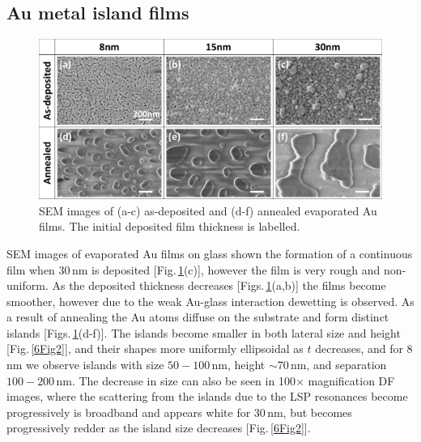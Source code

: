 \subsection{Au metal island films}
\begin{figure}[ht] 
\centering    
\includegraphics[width=\textwidth]{Fig1}
\caption{SEM images of (a-c) as-deposited and (d-f) annealed evaporated Au films. The initial deposited film thickness is labelled.}
\label{6Fig1}
\end{figure}
SEM images of evaporated Au films on glass shown the formation of a continuous film when 30\,nm is deposited [Fig.\,\ref{6Fig1}(c)], however the film is very rough and non-uniform. As the deposited thickness decreases [Figs.\,\ref{6Fig1}(a,b)] the films become smoother, however due to the weak Au-glass interaction dewetting is observed. As a result of annealing the Au atoms diffuse on the substrate and form distinct islands [Figs.\,\ref{6Fig1}(d-f)]. The islands become smaller in both lateral size and height [Fig.\,\ref{6Fig2}], and their shapes more uniformly ellipsoidal as $t$ decreases, and for 8\,nm we observe islands with size $50-100$\,nm, height $\sim$70\,nm, and separation $100-200$\,nm. The decrease in size can also be seen in 100$\times$ magnification DF images, where the scattering from the islands due to the LSP resonances become progressively is broadband and appears white for 30\,nm, but becomes progressively redder as the island size decreases [Fig.\,\ref{6Fig2}]. 
